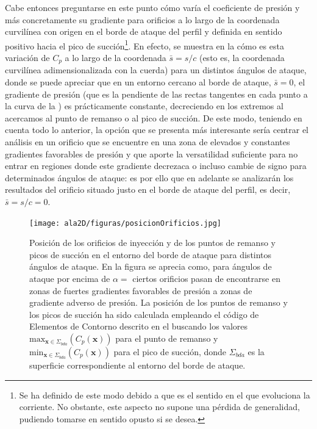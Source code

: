 Cabe entonces preguntarse en este punto cómo varía el coeficiente de presión y más concretamente su gradiente para orificios a lo largo de la coordenada curvilínea con origen en el borde de ataque del perfil y definida en sentido positivo hacia el pico de succión\footnote{Se ha definido de este modo debido a que es el sentido en el que evoluciona la corriente. No obstante, este aspecto no supone una pérdida de generalidad, pudiendo tomarse en sentido opusto si se desea.}. En efecto, se muestra en la  cómo es esta variación de $C_{p}$ a lo largo de la coordenada $\bar{s} = s/c$ (esto es, la coordenada curvilínea adimensionalizada con la cuerda) para un distintos ángulos de ataque, donde se puede apreciar que en un entorno cercano al borde de ataque, $\bar{s} = 0$, el gradiente de presión (que es la pendiente de las rectas tangentes en cada punto a la curva de la ) es prácticamente constante, decreciendo en los extremos al acercamos al punto de remanso o al pico de succión. De este modo, teniendo en cuenta todo lo anterior, la opción que se presenta más interesante sería centrar el análisis en un orificio que se encuentre en una zona de elevados y constantes gradientes favorables de presión y que aporte la versatilidad suficiente para no entrar en regiones donde este gradiente decrezaca o incluso cambie de signo para determinados ángulos de ataque: es por ello que en adelante se analizarán los resultados del orificio situado justo en el borde de ataque del perfil, es decir, $\bar{s} = s/c = 0$. 


\begin{figure}
\centering
\texttt{[image: ala2D/figuras/posicionOrificios.jpg]}
\caption{Posición de los orificios de inyección y de los puntos de remanso y picos de succión en el entorno del borde de ataque para distintos ángulos de ataque. En la figura se aprecia como, para ángulos de ataque por encima de $\alpha = $ %
ciertos orificios pasan de encontrarse en zonas de fuertes gradientes favorables de presión a zonas de gradiente adverso de presión. La posición de los puntos de remanso y los picos de succión ha sido calculada empleando el código de Elementos de Contorno descrito en el 
buscando los valores $\mathrm{max}_{\mathbf{x}\in\Sigma_{bda}}\left(C_{p}\left(\mathbf{x}\right)\right)$ para el punto de remanso y $\mathrm{min}_{\mathbf{x}\in\Sigma_{bda}}\left(C_{p}\left(\mathbf{x}\right)\right)$ para el pico de succión, donde $\Sigma_{bda}$ es la superficie correspondiente al entorno del borde de ataque.}
\end{figure}

